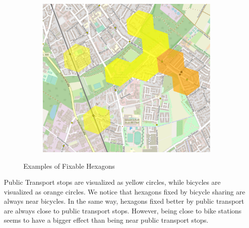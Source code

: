 \begin{figure}
\begin{subfigure}[b]{0.45\textwidth}
     \end{subfigure}
     \hfill
     \begin{subfigure}[b]{0.45\textwidth}
         \centering
         \includegraphics[width=\textwidth]{Figures/results/problematic_hexagons/example_4.png}
     \end{subfigure}
     \caption{Examples of Fixable Hexagons}
        \label{fig:fixable_hexagons_examples}
\end{figure}
Public Transport stops are visualized as yellow circles, while bicycles are visualized as orange circles.
We notice that hexagons fixed by bicycle sharing are always near bicycles.
In the same way, hexagons fixed better by public transport are always close to public transport stops. 
However, being close to bike stations seems to have a bigger effect than being near public transport stops.

